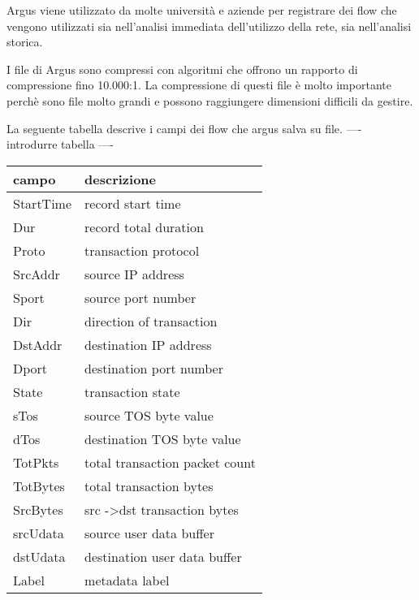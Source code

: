 \documentclass[../main.tex]{subfiles}
\begin{document}
Argus viene utilizzato da molte università e aziende per registrare dei flow che vengono utilizzati sia nell'analisi immediata dell'utilizzo della rete, sia nell'analisi storica.

I file di Argus sono compressi con algoritmi che offrono un rapporto di compressione fino 10.000:1. La compressione di questi file è molto importante perchè sono file molto grandi e possono raggiungere dimensioni difficili da gestire. \newline


La seguente tabella descrive i campi dei flow che argus salva su file.
---- introdurre tabella ----

\begin{table}[h]
\begin{tabular}{|l|l|}
\hline
\textbf{campo} & \textbf{descrizione}                    \\ \hline
StartTime      & record start time                       \\ \hline
Dur            & record total duration                   \\ \hline
Proto          & transaction protocol                    \\ \hline
SrcAddr        & source IP address                       \\ \hline
Sport          & source port number                      \\ \hline
Dir            & direction of transaction                \\ \hline
DstAddr        & destination IP address                  \\ \hline
Dport          & destination port number                 \\ \hline
State          & transaction state                       \\ \hline
sTos           & source TOS byte value                   \\ \hline
dTos           & destination TOS byte value              \\ \hline
TotPkts        & total transaction packet count          \\ \hline
TotBytes       & total transaction bytes                 \\ \hline
SrcBytes       & src -\textgreater dst transaction bytes \\ \hline
srcUdata       & source user data buffer                 \\ \hline
dstUdata       & destination user data buffer            \\ \hline
Label          & metadata label                          \\ \hline
\end{tabular}
\end{table}
\end{document}
